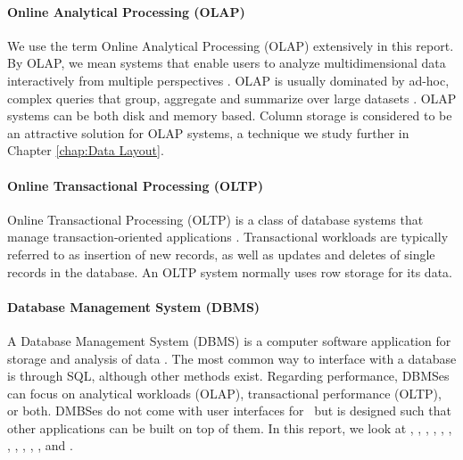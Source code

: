 \paragraph{Online Analytical Processing (OLAP)}
\label{par:Online Analytical Processing (OLAP)}
  We use the term Online Analytical Processing (OLAP) extensively in this report. By OLAP, we mean systems that enable users to analyze multidimensional data interactively from multiple perspectives \cite{Wikipedia_contributors2015-hw}. OLAP is usually dominated by ad-hoc, complex queries that group, aggregate and summarize over large datasets \cite{Bjorklund2011-wh}. OLAP systems can be both disk and memory based. Column storage is considered to be an attractive solution for OLAP systems, a technique we study further in Chapter \ref{chap:Data Layout}.


\paragraph{Online Transactional Processing (OLTP)}
\label{par:Online Transactional Processing (OLTP)}
Online Transactional Processing (OLTP) is a class of database systems that manage transaction-oriented applications \cite{Wikipedia_contributors2015-cw}. Transactional workloads are typically referred to as insertion of new records, as well as updates and deletes of single records in the database. An OLTP system normally uses row storage for its data.

\paragraph{Database Management System (DBMS)}
\label{par:Database Management System (DBMS)}
A Database Management System (DBMS) is a computer software application for storage and analysis of data \cite{Wikipedia_contributors2015-pb}. The most common way to interface with a database is through SQL, although other methods exist. Regarding performance, DBMSes can focus on analytical workloads (OLAP), transactional performance (OLTP), or both. DMBSes do not come with user interfaces for \bd~but is designed such that other applications can be built on top of them. In this report, we look at \oracle, \ibm, \saph, \sapnw, \mssql, \cstore, \vertica, \blink, \exasol, \oracle, \hyper, and \hyrise.

